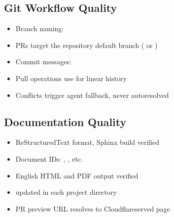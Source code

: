 \documentclass[letterpaper,10pt,openany,oneside,english]{sphinxmanual}
\begin{document}
\subsection{Git Workflow Quality}
\label{\detokenize{quality:git-workflow-quality}}\begin{itemize}
\item {} 
\sphinxAtStartPar
Branch naming: 

\item {} 
\sphinxAtStartPar
PRs target the repository default branch ( or )

\item {} 
\sphinxAtStartPar
Commit messages: 

\item {} 
\sphinxAtStartPar
Pull operations use  for linear history

\item {} 
\sphinxAtStartPar
Conflicts trigger agent fallback, never auto\sphinxhyphen{}resolved

\end{itemize}


\subsection{Documentation Quality}
\label{\detokenize{quality:documentation-quality}}\begin{itemize}
\item {} 
\sphinxAtStartPar
ReStructuredText format, Sphinx build verified

\item {} 
\sphinxAtStartPar
Document IDs: , , etc.

\item {} 
\sphinxAtStartPar
English HTML and PDF output verified

\item {} 
\sphinxAtStartPar
{} updated in each project directory

\item {} 
\sphinxAtStartPar
PR preview URL resolves to Cloudflare\sphinxhyphen{}served page

\end{itemize}
\end{document}
